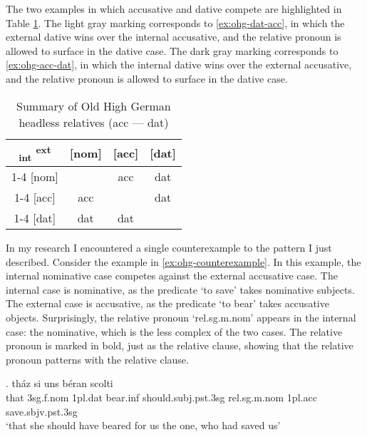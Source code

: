 The two examples in which accusative and dative compete are highlighted in Table \ref{tbl:summary-old-high-german-acc-dat}. The light gray marking corresponds to \ref{ex:ohg-dat-acc}, in which the external dative wins over the internal accusative, and the relative pronoun is allowed to surface in the dative case. The dark gray marking corresponds to \ref{ex:ohg-acc-dat}, in which the internal dative wins over the external accusative, and the relative pronoun is allowed to surface in the dative case.

\begin{table}[H]
  \center
  \caption{Summary of Old High German headless relatives (\ac{acc} --- \ac{dat})}
  \begin{tabular}{c|c|c|c}
    \toprule
        \textsubscript{\ac{int}} \textsuperscript{\ac{ext}}
          & [\ac{nom}]
          & [\ac{acc}]
          & [\ac{dat}]
          \\ \cmidrule{1-4}
      [\ac{nom}]
          & \xcancel{\phantom{xx}}
          & \ac{acc}
          & \ac{dat}
          \\ \cmidrule{1-4}
      [\ac{acc}]
          & \ac{acc}
          & \xcancel{\phantom{xx}}
          & \cellcolor{LG}\ac{dat}
          \\ \cmidrule{1-4}
      [\ac{dat}]
          & \ac{dat}
          & \cellcolor{DG}\ac{dat}
          & \xcancel{\phantom{xx}}
          \\
    \bottomrule
  \end{tabular}
    \label{tbl:summary-old-high-german-acc-dat}
\end{table}

In my research I encountered a single counterexample to the pattern I just described.
Consider the example in \ref{ex:ohg-counterexample}. In this example, the internal nominative case competes against the external accusative case.
The internal case is nominative, as the predicate  `to save' takes nominative subjects.
The external case is accusative, as the predicate  `to bear' takes accusative objects.
Surprisingly, the relative pronoun  `\ac{rel}.\ac{sg}.\ac{m}.\ac{nom}' appears in the internal case: the nominative, which is the less complex of the two cases. The relative pronoun is marked in bold, just as the relative clause, showing that the relative pronoun patterns with the relative clause.

\exg. tház si uns béran scolti   \\
 that 3\ac{sg}.\ac{f}.\ac{nom} 1\ac{pl}.\ac{dat} bear.\ac{inf}\scsub{[acc]} should.\ac{subj}.\ac{pst}.3\ac{sg} \ac{rel}.\ac{sg}.\ac{m}.\ac{nom} 1\ac{pl}.\ac{acc} save.\ac{sbjv}.\ac{pst}.3\ac{sg}\scsub{[nom]}\\
 `that she should have beared for us the one, who had saved us' \label{ex:ohg-counterexample}

